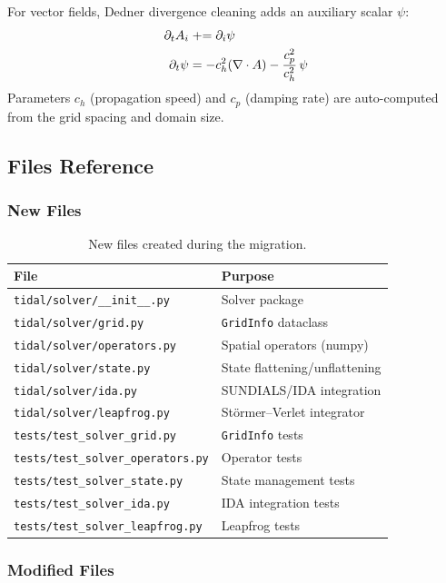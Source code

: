 For vector fields, Dedner divergence cleaning adds an auxiliary scalar $\psi$:
\begin{align}
  \partial_t A_i &\mathrel{+}= \partial_i \psi \\
  \partial_t \psi &= -c_h^2 (\nabla \cdot A) - \frac{c_p^2}{c_h^2}\, \psi
\end{align}
Parameters $c_h$ (propagation speed) and $c_p$ (damping rate) are auto-computed
from the grid spacing and domain size.

\subsection{Files Reference}
\label{sec:files-reference}

\subsubsection{New Files}

\begin{table}[htbp]
\centering
\caption{New files created during the migration.}
\label{tab:new-files}
\begin{tabular}{@{}ll@{}}
\toprule
File & Purpose \\
\midrule
\texttt{tidal/solver/\_\_init\_\_.py} & Solver package \\
\texttt{tidal/solver/grid.py} & \texttt{GridInfo} dataclass \\
\texttt{tidal/solver/operators.py} & Spatial operators (numpy) \\
\texttt{tidal/solver/state.py} & State flattening/unflattening \\
\texttt{tidal/solver/ida.py} & SUNDIALS/IDA integration \\
\texttt{tidal/solver/leapfrog.py} & St\"ormer--Verlet integrator \\
\texttt{tests/test\_solver\_grid.py} & \texttt{GridInfo} tests \\
\texttt{tests/test\_solver\_operators.py} & Operator tests \\
\texttt{tests/test\_solver\_state.py} & State management tests \\
\texttt{tests/test\_solver\_ida.py} & IDA integration tests \\
\texttt{tests/test\_solver\_leapfrog.py} & Leapfrog tests \\
\bottomrule
\end{tabular}
\end{table}

\subsubsection{Modified Files}

